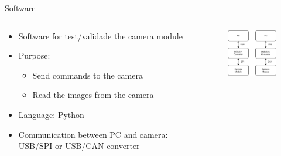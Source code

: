 \begin{frame}{Software}

    \begin{columns}[t]
        \begin{column}[t]{0.55\textwidth}
            \begin{itemize}
                \item Software for test/validade the camera module
                \item Purpose:
                    \begin{itemize}
                        \item Send commands to the camera
                        \item Read the images from the camera
                    \end{itemize}
                \item Language: Python
                \item Communication between PC and camera: USB/SPI or USB/CAN converter
            \end{itemize}
        \end{column}
        \begin{column}[t]{0.45\textwidth}
            \vspace{0.5cm}
            \begin{figure}[!ht]
                \begin{center}
                    \includegraphics[width=4.5cm]{figures/software-diagram}
                \end{center}
            \end{figure}
        \end{column}
    \end{columns}

\end{frame}